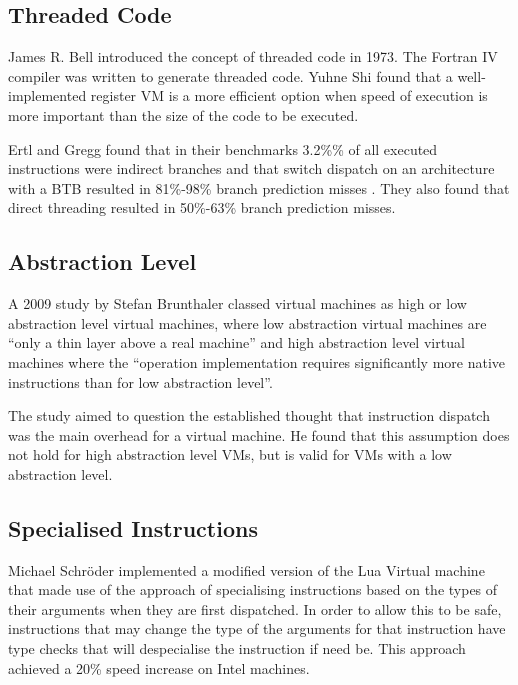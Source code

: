 \documentclass[english,a4paper]{report}
\begin{document}
\subsection{Threaded Code}

James R. Bell introduced the concept of threaded code in 1973. The
Fortran IV compiler was written to generate threaded code.\cite{Bell}
Yuhne Shi\cite{Shi2007} found that a well-implemented register VM is a
more efficient option when speed of execution is more important than
the size of the code to be executed.

Ertl and Gregg found that in their benchmarks 3.2\%\% of
all executed instructions were indirect branches and that switch
dispatch on an architecture with a BTB resulted in 81\%-98\% branch
prediction misses \cite{EfficientInterpreters}. They also found that
direct threading resulted in 50\%-63\% branch prediction misses.

\subsection{Abstraction Level}

A 2009 study\cite{Brunthaler20093} by Stefan Brunthaler classed
virtual machines as high or low abstraction level virtual machines,
where low abstraction virtual machines are ``only a thin layer above a
real machine'' and high abstraction level virtual machines where the
``operation implementation requires significantly more native
instructions than for low abstraction level''.

The study aimed to question the established thought that instruction
dispatch was the main overhead for a virtual machine. He found that
this assumption does not hold for high abstraction level VMs, but is
valid for VMs with a low abstraction level.

\subsection{Specialised Instructions}

Michael Schr{\"o}der implemented a modified version of the Lua Virtual
machine that made use of the approach of specialising instructions
based on the types of their arguments when they are first
dispatched. In order to allow this to be safe, instructions that may
change the type of the arguments for that instruction have type checks
that will despecialise the instruction if need be. This approach
achieved a 20\% speed increase on Intel machines\cite{Schroder2012}.
\end{document}
